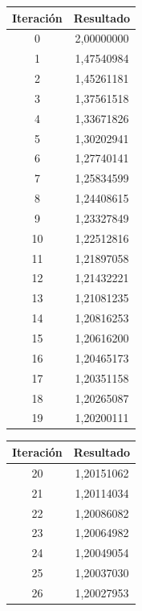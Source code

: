 \documentclass[titlepage,a4paper]{article}
\begin{document}
\begin{multicols}{2}
    \begin{center}
        \begin{tabular}{| c | c |}
        \hline
         Iteración & Resultado \\ \hline
            0     & 2,00000000 \\
            1     & 1,47540984 \\
            2     & 1,45261181 \\
            3     & 1,37561518 \\
            4     & 1,33671826 \\
            5     & 1,30202941 \\
            6     & 1,27740141 \\
            7     & 1,25834599 \\
            8     & 1,24408615 \\
            9     & 1,23327849 \\
            10    & 1,22512816 \\
            11    & 1,21897058 \\
            12    & 1,21432221 \\
            13    & 1,21081235 \\
            14    & 1,20816253 \\
            15    & 1,20616200 \\
            16    & 1,20465173 \\
            17    & 1,20351158 \\
            18    & 1,20265087 \\
            19    & 1,20200111 \\
                \hline
        \end{tabular}
    \end{center}
    \begin{center}
        \begin{tabular}{| c | c |}
        \hline
         Iteración & Resultado \\ \hline
            20    & 1,20151062 \\
            21    & 1,20114034 \\
            22    & 1,20086082 \\
            23    & 1,20064982 \\
            24    & 1,20049054 \\
            25    & 1,20037030 \\
            26    & 1,20027953 \\

\end{tabular}
\end{center}
\end{multicols}
\end{document}
